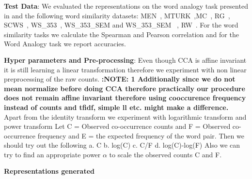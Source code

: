 \documentclass[11pt]{article}
\begin{document}
\textbf{Test Data}: We evaluated the representations on the word
analogy task presented in \cite{mikolov2013distributed} and the
following word similarity datasets: 
MEN~\cite{bruni2012distributional},
MTURK~\cite{Radinsky2011word},MC~\cite{miller1991contextual},
RG~\cite{Rubenstein1965Contextual}, SCWS~\cite{Huang2012Improving},
WS\_353~\cite{finkelstein2001placing}, WS\_353\_SEM and WS\_353\_SEM
~\cite{agirre2009study}, RW~\cite{Luong2013morpho}. For the word
similarity tasks we calculate the Spearman and
Pearson correlation and for the Word Analogy task we report
accuracies. 

\textbf{Hyper parameters and Pre-processing}: Even though CCA is
affine invariant it is still learning a linear transformation
therefore we experiment with non linear preprocessing of the raw
counts. \textbf{:NOTE: 1 Additionally since  we do not
mean normalize before doing CCA therefore practically our procedure
does not remain affine invariant therefore using cooccurence frequency
instead of counts and tfidf, simple ll etc. might make a difference.}
Apart from the identity transform we experiment with logarithmic
transform and power transform
Let C = Observed co-occurrence counts
and F = Observed co-occurrence frequency
and E =  the expected frequency of the word pair.
Then we should try out the following
a. C
b. log(C)
c. C/F
d. log(C)-log(F)
Also we can try to find an appropriate power $\alpha$ to scale the
observed counts C and F.

\textbf{Representations generated}
\end{document}
